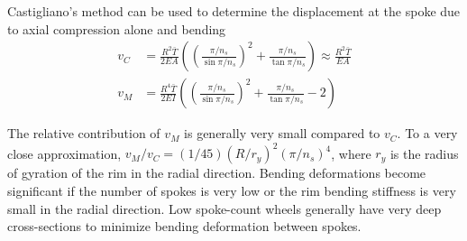 \documentclass[\rootdir/thesis.tex]{subfiles}
\begin{document}
Castigliano's method can be used to determine the displacement at the spoke due to axial compression alone and bending
\begin{align}
v_C &= \frac{R^2\bar{T}}{2EA} \left( \left(\frac{\pi/n_s}{\sin{\pi/n_s}}\right)^2 +
    \frac{\pi/n_s}{\tan{\pi/n_s}}\right)
    \approx \frac{R^2\bar{T}}{EA}\label{eq:vC}\\
v_M &= \frac{R^4\bar{T}}{2EI} \left( \left(\frac{\pi/n_s}{\sin{\pi/n_s}}\right)^2 +
    \frac{\pi/n_s}{\tan{\pi/n_s}} - 2\right)\label{eq:vM}
\end{align}

The relative contribution of $v_M$ is generally very small compared to $v_C$. To a very close approximation, $v_M/v_C=(1/45)(R/r_y)^2(\pi/n_s)^4$, where $r_y$ is the radius of gyration of the rim in the radial direction. Bending deformations become significant if the number of spokes is very low or the rim bending stiffness is very small in the radial direction. Low spoke-count wheels generally have very deep cross-sections to minimize bending deformation between spokes.
\end{document}
